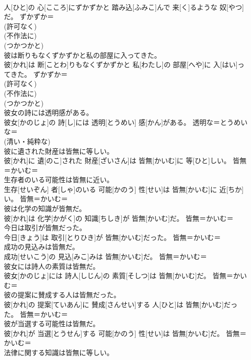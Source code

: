 \documentclass[8pt]{extreport}
\begin{document}
\begin{CJK}{UTF8}{min}
{\\	人[ひと]の 心[こころ]にずかずかと 踏み込[ふみこ]んで 来[く]るような 奴[やつ]だ。	ずかずか＝ 
\\	(許可なく) 
\\	(不作法に) 
\\	(つかつかと)
\\	彼は断りもなくずかずかと私の部屋に入ってきた。	
\\	彼[かれ]は 断[ことわ]りもなくずかずかと 私[わたし]の 部屋[へや]に 入[はい]ってきた。	ずかずか＝ 
\\	(許可なく) 
\\	(不作法に) 
\\	(つかつかと)
\\	彼女の詩には透明感がある。	
\\	彼女[かのじょ]の 詩[し]には 透明[とうめい] 感[かん]がある。	透明な＝とうめいな＝ 
\\	(清い・純粋な) 
\\	彼に遺された財産は皆無に等しい。	
\\	彼[かれ]に 遺[のこ]された 財産[ざいさん]は 皆無[かいむ]に 等[ひと]しい。	皆無＝かいむ＝ 
\\	生存者のいる可能性は皆無に近い。	
\\	生存[せいぞん] 者[しゃ]のいる 可能[かのう] 性[せい]は 皆無[かいむ]に 近[ちか]い。	皆無＝かいむ＝ 
\\	彼は化学の知識が皆無だ。	
\\	彼[かれ]は 化学[かがく]の 知識[ちしき]が 皆無[かいむ]だ。	皆無＝かいむ＝ 
\\	今日は取引が皆無だった。	
\\	今日[きょう]は 取引[とりひき]が 皆無[かいむ]だった。	皆無＝かいむ＝ 
\\	成功の見込みは皆無だ。	
\\	成功[せいこう]の 見込[みこ]みは 皆無[かいむ]だ。	皆無＝かいむ＝ 
\\	彼女には詩人の素質は皆無だ。	
\\	彼女[かのじょ]には 詩人[しじん]の 素質[そしつ]は 皆無[かいむ]だ。	皆無＝かいむ＝ 
\\	彼の提案に賛成する人は皆無だった。	
\\	彼[かれ]の 提案[ていあん]に 賛成[さんせい]する 人[ひと]は 皆無[かいむ]だった。	皆無＝かいむ＝ 
\\	彼が当選する可能性は皆無だ。	
\\	彼[かれ]が 当選[とうせん]する 可能[かのう] 性[せい]は 皆無[かいむ]だ。	皆無＝かいむ＝ 
\\	法律に関する知識は皆無に等しい。	
}
\end{CJK}
\end{document}
